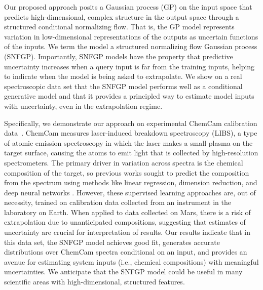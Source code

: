 \documentclass[letterpaper]{article} %
\begin{document}
Our proposed approach posits a Gaussian process (GP) on the input space that predicts high-dimensional, complex structure in the output space through a structured conditional normalizing flow.
That is, the GP model represents variation in low-dimensional representations of the outputs as uncertain functions of the inputs.
We term the model a structured normalizing flow Gaussian process (SNFGP). 
Importantly, SNFGP models have the property that predictive uncertainty increases when a query input is far from the training inputs, helping to indicate when the model is being asked to extrapolate.
We show on a real spectroscopic data set that the SNFGP model performs well as a conditional generative model and that it provides a principled way to estimate model inputs with uncertainty, even in the extrapolation regime.

Specifically, we demonstrate our approach on experimental ChemCam calibration data~\cite{maurice2012chemcam}.
ChemCam measures laser-induced breakdown spectroscopy (LIBS), a type of atomic emission spectroscopy in which the laser makes a small plasma on the target surface, causing the atoms to emit light that is collected by high-resolution spectrometers.
The primary driver in variation across spectra is the chemical composition of the target, so previous works sought to predict the composition from the spectrum using methods like linear regression, dimension reduction, and deep neural networks  \cite{wiens2013pre,forni2013independent, clegg2017recalibration, anderson2017improved, castorena2021deep}.
However, these supervised learning approaches are, out of necessity, trained on calibration data collected from an instrument in the laboratory on Earth. 
When applied to data collected on Mars, there is a risk of extrapolation due to unanticipated compositions, suggesting that estimates of uncertainty are crucial for interpretation of results.
Our results indicate that in this data set, the SNFGP model achieves good fit, generates accurate distributions over ChemCam spectra conditional on an input, and provides an avenue for estimating system inputs (i.e., chemical compositions) with meaningful uncertainties. 
We anticipate that the SNFGP model could be useful in many scientific areas with high-dimensional, structured features.
\end{document}
